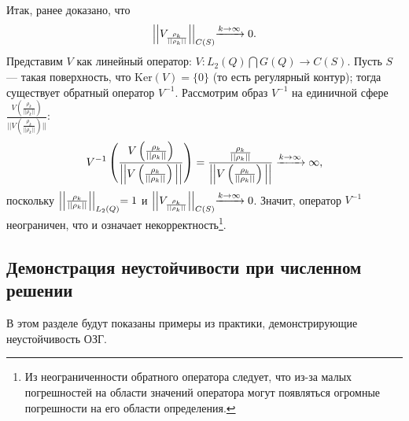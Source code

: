 \documentclass[a4paper]{article}
\begin{document}
Итак, ранее доказано, что $$\Bigl|\Bigl|V_{\frac{\rho_k}{||\rho_k ||}}  \Bigl|\Bigl|_{C(S)}\xrightarrow{k \rightarrow \infty} 0.$$
Представим $V$ как линейный оператор: $V: L_2(Q) \bigcap G(Q) \rightarrow C(S)$. Пусть $S$ --- такая поверхность, что $\text{Ker} (V)=\{0\}$ (то есть регулярный контур);
тогда существует обратный оператор $V^{-1}$.
Рассмотрим образ $V^{-1}$ на единичной сфере $\frac{V\left(\frac{\rho_k}{||\rho_k ||}\right)}{||V\left(\frac{\rho_k}{||\rho_k ||}\right)||}$:
\begin{equation}
  V^{-1}\left(\frac{V\left(\frac{\rho_k}{||\rho_k ||}\right)}{\Bigl|\Bigl|V\left(\frac{\rho_k}{||\rho_k ||}\right)\Bigl|\Bigl|}\right)=\frac{\frac{\rho_k}{||\rho_k ||}}{\Bigl|\Bigl|V\left(\frac{\rho_k}{||\rho_k ||}\right)\Bigl|\Bigl|} \xrightarrow{k\rightarrow \infty} \infty,
\end{equation}
поскольку $\Bigl|\Bigl|\frac{\rho_k}{||\rho_k ||}\Bigl|\Bigl|_{L_2(Q)}=1$ и $\Bigl|\Bigl|V_{\frac{\rho_k}{||\rho_k ||}}  \Bigl|\Bigl|_{C(S)}\xrightarrow{k \rightarrow \infty} 0$.
Значит, оператор $V^{-1}$ неограничен, что и означает некорректность\footnote{Из неограниченности обратного оператора следует, что из-за малых погрешностей на области значений оператора могут появляться огромные погрешности на его области определения.}.

\subsection{Демонстрация неустойчивости при численном решении}
В этом разделе будут показаны примеры из практики, демонстрирующие неустойчивость ОЗГ.
\end{document}
